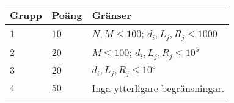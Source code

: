 \noindent
\begin{tabular}{| l | l | p{12cm} |}
  \hline
  \textbf{Grupp} & \textbf{Poäng} & \textbf{Gränser} \\ \hline
  $1$    & $10$       & $N, M \le 100$; $d_i, L_j, R_j \le 1000$ \\ \hline
  $2$    & $20$       & $M \le 100$; $d_i, L_j, R_j \le 10^5$ \\ \hline
  $3$    & $20$       & $d_i, L_j, R_j \le 10^5$ \\ \hline
  $4$    & $50$       & Inga ytterligare begränsningar. \\ \hline
\end{tabular}
